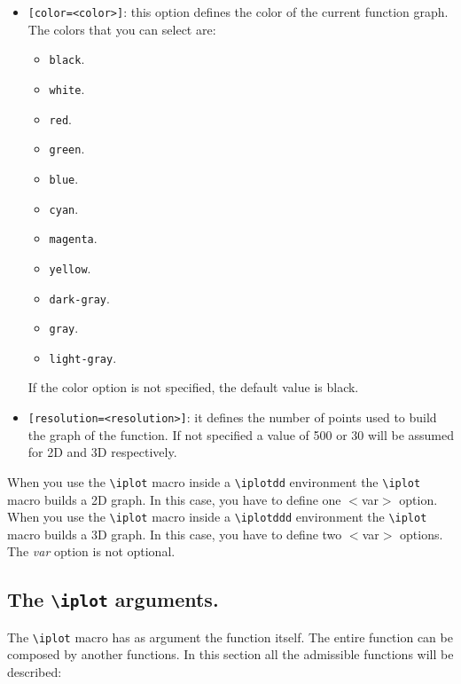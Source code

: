 \documentclass[a4paper,12pt]{article}
\begin{document}
\begin{itemize}
\item \verb+[color=<color>]+: this option defines the color of the current function graph.
The colors that you can select are:
\begin{itemize}
\item \verb+black+.
\item \verb+white+.
\item \verb+red+.
\item \verb+green+.
\item \verb+blue+.
\item \verb+cyan+.
\item \verb+magenta+.
\item \verb+yellow+.
\item \verb+dark-gray+.
\item \verb+gray+.
\item \verb+light-gray+.
\end{itemize}

If the color option is not specified, the default value is black.

\item \verb+[resolution=<resolution>]+: it defines the number of points used to build the graph of the function. If not specified a value of 500 or 30 will be assumed for 2D and 3D respectively.
\end{itemize}

When you use the \texttt{\textbackslash iplot} macro inside a \texttt{\textbackslash iplotdd} environment the \texttt{\textbackslash iplot} macro builds a 2D graph. In this case, you have to define one $<$var$>$ option.
When you use the \texttt{\textbackslash iplot} macro inside a \texttt{\textbackslash iplotddd} environment the \texttt{\textbackslash iplot} macro builds a 3D graph. In this case, you have to define two $<$var$>$ options.
 The \emph{var} option is not optional.

\subsection{The \texttt{\textbackslash iplot} arguments.}

The \texttt{\textbackslash iplot} macro has as argument the function itself.  The entire function can be composed by another functions. In this section all the admissible functions will be described:
\end{document}
